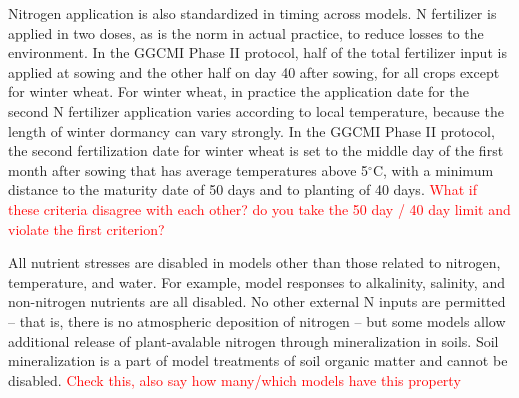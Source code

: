 \documentclass[gmd, manuscript]{copernicus} %
\begin{document}
{%


Nitrogen application is also standardized in timing across models.  N fertilizer is applied in two doses, as is the norm in actual practice, to reduce losses to the environment. In the GGCMI Phase II protocol, half of the total fertilizer input is applied at sowing and the other half on day 40 after sowing, for all crops except for winter wheat. For winter wheat, in practice the application date for the second N fertilizer application varies according to local temperature, because the length of winter dormancy can vary strongly.  In the GGCMI Phase II protocol, the second fertilization date for winter wheat is set to the middle day of the first month after sowing that has average temperatures above 5$^\circ$C, with a minimum distance to the maturity date of 50 days and to planting of 40 days. \textcolor{red}{What if these criteria disagree with each other? do you take the 50 day / 40 day limit and violate the first criterion?}

All nutrient stresses are disabled in models other than those related to nitrogen, temperature, and water. For example, model responses to alkalinity, salinity, and non-nitrogen nutrients are all disabled. 
No other external N inputs are permitted -- that is, there is no atmospheric deposition of nitrogen --  but some models
allow additional release of plant-avalable nitrogen through mineralization in soils. Soil mineralization is a part of model treatments of soil organic matter and cannot be disabled. \textcolor{red}{Check this, also say how many/which models have this property} 

}
\end{document}

